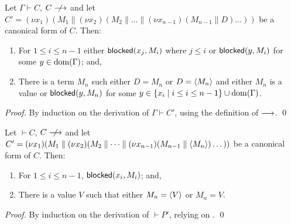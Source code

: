 \documentclass[orivec,envcountsame]{llncs}
\begin{document}
\begin{theorem}\label{thm:progress-open}
  Let $\Gamma \vdash C$, $C \centernot\ceval$ and let $C' = (\nu x_1)(M_1 \parallel (\nu
  x_2)(M_2 \parallel \dots \parallel (\nu x_{n-1})(M_{n-1} \parallel D)\dots))$ be
  a canonical form of $C$.  Then:
  \begin{enumerate}
  \item For $1 \leq i \leq n - 1$ either $\mathsf{blocked}(x_j,M_i)$ where $j \leq i$ or $\mathsf{blocked}(y,M_i)$
    for some $y \in \operatorname{dom}(\Gamma)$; and,
  \item There is a term $M_n$ such either $D = M_n$ or $D = \langle M_n \rangle$ and either $M_n$ is a
    value or $\mathsf{blocked}(y,M_n)$ for some $y \in \{ x_i \mid i \leq i \leq n - 1 \} \cup
    \operatorname{dom}(\Gamma)$.
  \end{enumerate}
\end{theorem}

\begin{proof}
  By induction on the derivation of $\Gamma \vdash C'$, using the definition of $\longrightarrow$. \qed
\end{proof}

\begin{corollary}\label{thm:progress}
  Let $\vdash C$, $C \centernot\ceval$ and let $C' = (\nu x_1)(M_1 \parallel (\nu
  x_2)(M_2 \parallel \dots \parallel (\nu x_{n-1})(M_{n-1} \parallel \langle M_n \rangle)\dots))$ be
  a canonical form of $C$.  Then:
  \begin{enumerate}
  \item For $1 \leq i \leq n - 1$, $\mathsf{blocked}(x_i,M_i)$; and,
  \item There is a value $V$ such that either $M_n = \langle V \rangle$ or $M_n = V$.
  \end{enumerate}
\end{corollary}

\begin{proof}
  By induction on the derivation of $\vdash P'$, relying on .  \qed
\end{proof}
\end{document}
